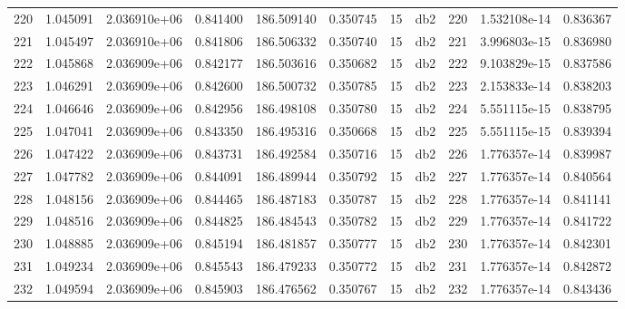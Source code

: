 \begin{tabular}{lrrrrrrlrrr}
220  &    1.045091 &        2.036910e+06 &  0.841400 &              186.509140 &    0.350745 &      15 &          db2 &    220 &   1.532108e-14 &      0.836367 \\
221  &    1.045497 &        2.036910e+06 &  0.841806 &              186.506332 &    0.350740 &      15 &          db2 &    221 &   3.996803e-15 &      0.836980 \\
222  &    1.045868 &        2.036909e+06 &  0.842177 &              186.503616 &    0.350682 &      15 &          db2 &    222 &   9.103829e-15 &      0.837586 \\
223  &    1.046291 &        2.036909e+06 &  0.842600 &              186.500732 &    0.350785 &      15 &          db2 &    223 &   2.153833e-14 &      0.838203 \\
224  &    1.046646 &        2.036909e+06 &  0.842956 &              186.498108 &    0.350780 &      15 &          db2 &    224 &   5.551115e-15 &      0.838795 \\
225  &    1.047041 &        2.036909e+06 &  0.843350 &              186.495316 &    0.350668 &      15 &          db2 &    225 &   5.551115e-15 &      0.839394 \\
226  &    1.047422 &        2.036909e+06 &  0.843731 &              186.492584 &    0.350716 &      15 &          db2 &    226 &   1.776357e-14 &      0.839987 \\
227  &    1.047782 &        2.036909e+06 &  0.844091 &              186.489944 &    0.350792 &      15 &          db2 &    227 &   1.776357e-14 &      0.840564 \\
228  &    1.048156 &        2.036909e+06 &  0.844465 &              186.487183 &    0.350787 &      15 &          db2 &    228 &   1.776357e-14 &      0.841141 \\
229  &    1.048516 &        2.036909e+06 &  0.844825 &              186.484543 &    0.350782 &      15 &          db2 &    229 &   1.776357e-14 &      0.841722 \\
230  &    1.048885 &        2.036909e+06 &  0.845194 &              186.481857 &    0.350777 &      15 &          db2 &    230 &   1.776357e-14 &      0.842301 \\
231  &    1.049234 &        2.036909e+06 &  0.845543 &              186.479233 &    0.350772 &      15 &          db2 &    231 &   1.776357e-14 &      0.842872 \\
232  &    1.049594 &        2.036909e+06 &  0.845903 &              186.476562 &    0.350767 &      15 &          db2 &    232 &   1.776357e-14 &      0.843436 \\

\end{tabular}
